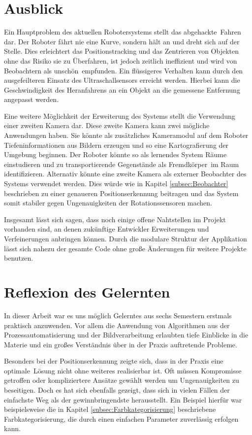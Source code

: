 \section{Ausblick}

Ein Hauptproblem des aktuellen Robotersystems stellt das \glqq abgehackte\grqq\ Fahren dar. Der Roboter fährt nie eine Kurve, sondern hält an und dreht sich auf der Stelle. Dies erleichtert das Positionstracking und das Zentrieren von Objekten ohne das Risiko sie zu Überfahren, ist jedoch zeitlich ineffizient und wird von Beobachtern als \glqq unschön\grqq\ empfunden. Ein flüssigeres Verhalten kann durch den ausgefeilteren Einsatz des Ultraschallsensors erreicht werden. Hierbei kann die Geschwindigkeit des Heranfahrens an ein Objekt an die gemessene Entfernung angepasst werden.

Eine weitere Möglichkeit der Erweiterung des Systems stellt die Verwendung einer zweiten Kamera dar. Diese zweite Kamera kann zwei mögliche Anwendungen haben. Sie könnte als zusätzliches Kameramodul auf dem Roboter Tiefeninformationen aus Bildern erzeugen und so eine Kartografierung der Umgebung beginnen. Der Roboter könnte so als lernendes System Räume einstudieren und zu transportierende Gegenstände als \glqq Fremdkörper\grqq\ im Raum identifizieren. Alternativ könnte eine zweite Kamera als externer Beobachter des Systems verwendet werden. Dies würde wie in Kapitel \ref{subsec:Beobachter} beschrieben zu einer genaueren Positionserkennung beitragen und das System somit stabiler gegen Ungenauigkeiten der Rotationssensoren machen.

Insgesamt lässt sich sagen, dass noch einige offene Nahtstellen im Projekt vorhanden sind, an denen zukünftige Entwickler Erweiterungen und Verfeinerungen anbringen können. Durch die modulare Struktur der Applikation lässt sich nahezu der gesamte Code ohne große Änderungen für weitere Projekte benutzen.

\section{Reflexion des Gelernten}

In dieser Arbeit war es uns möglich Gelerntes aus sechs Semestern erstmals praktisch anzuwenden. Vor allem die Anwendung von Algorithmen aus der Prozessautomatisierung und der Bildverarbeitung erlaubten tiefe Einblicke in die Materie und ein großes Verständnis über in der Praxis auftretende Probleme.

Besonders bei der Positionserkennung zeigte sich, dass in der Praxis eine \glqq optimale\grqq\ Lösung nicht ohne weiteres realisierbar ist. Oft müssen Kompromisse getroffen oder kompliziertere Ansätze gewählt werden um Ungenauigkeiten zu beseitigen. Doch es hat sich ebenfalls gezeigt, dass sich in vielen Fällen der einfachste Weg als der gewinnbringendste herausstellt. Ein Beispiel hierfür war beispielsweise die in Kapitel \ref{subsec:Farbkategorisierung} beschriebene Farbkategorisierung, die durch einen einfachen Parameter zuverlässig erfolgen kann.

